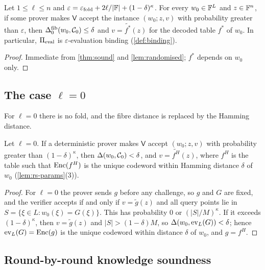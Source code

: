 \begin{corollary}\label{cor:binding}
Let $1 \le \ell \le n$ and $\varepsilon = \varepsilon_{\mathrm{fold}} + 2\ell/|\mathbb{F}| + (1-\delta)^{\kappa}$.
For every $w_0 \in \mathbb{F}^L$ and $z \in \mathbb{F}^n$, if some prover makes $\mathsf{V}$ accept the instance $(w_0; z,v)$ with probability greater than $\varepsilon$, then $\Delta^{\mathrm{fib}}_0(w_0,\mathcal{C}_0) \le \delta$ and $v = \tilde{f^*}(z)$ for the decoded table $f^*$ of $w_0$.
In particular, $\Pi_{\mathrm{eval}}$ is $\varepsilon$-evaluation binding (\cref{def:binding}).
\end{corollary}

\begin{proof}
Immediate from \cref{thm:sound} and \cref{lem:randomised}; $f^*$ depends on $w_0$ only.
\end{proof}

\subsection{The case \texorpdfstring{$\ell = 0$}{l = 0}}\label{sec:sound:l0}

For $\ell = 0$ there is no fold, and the fibre distance is replaced by the Hamming distance.

\begin{proposition}[No folding]\label{prop:l0}
Let $\ell = 0$. If a deterministic prover makes $\mathsf{V}$ accept $(w_0; z,v)$ with probability greater than $(1-\delta)^{\kappa}$, then $\Delta(w_0, \mathcal{C}_0) < \delta$, and $v = \tilde{f^H}(z)$, where $f^H$ is the table such that $\mathrm{Enc}(f^H)$ is the unique codeword within Hamming distance $\delta$ of $w_0$ (\cref{lem:rs-params}(3)).
\end{proposition}

\begin{proof}
For $\ell = 0$ the prover sends $g$ before any challenge, so $g$ and $G$ are fixed, and the verifier accepts if and only if $v = \tilde g(z)$ and all query points lie in $S = \{\xi \in L : w_0(\xi) = G(\xi)\}$.
This has probability $0$ or $(|S|/M)^\kappa$. If it exceeds $(1-\delta)^\kappa$, then $v = \tilde g(z)$ and $|S| > (1-\delta)M$, so $\Delta(w_0, \mathrm{ev}_L(G)) < \delta$; hence $\mathrm{ev}_L(G) = \mathrm{Enc}(g)$ is the unique codeword within distance $\delta$ of $w_0$, and $g = f^H$.
\end{proof}

\subsection{Round-by-round knowledge soundness}\label{sec:sound:rbr}


